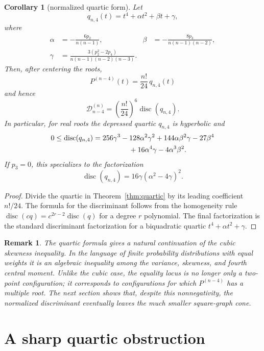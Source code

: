 \documentclass[11pt]{amsart}
\numberwithin{equation}{section}
\newtheorem{corollary}[theorem]{Corollary}
\newtheorem{remark}[theorem]{Remark}
\newcommand{\D}{\mathcal D}
\newcommand{\disc}{\operatorname{disc}}
\begin{document}
\begin{corollary}[normalized quartic form]\label{cor:normalized-quartic}
Let
\[
q_{n,4}(t)=t^4+\alpha t^2+\beta t+\gamma,
\]
where
\[
\begin{aligned}
\alpha&=-\frac{6p_2}{n(n-1)},
&\beta&=-\frac{8p_3}{n(n-1)(n-2)},\\
\gamma&=\frac{3(p_2^2-2p_4)}{n(n-1)(n-2)(n-3)}.
\end{aligned}
\]
Then, after centering the roots,
\[
P^{(n-4)}(t)=\frac{n!}{24}\,q_{n,4}(t)
\]
and hence
\[
\D_{n-4}^{(n)}=\left(\frac{n!}{24}\right)^6\disc(q_{n,4}).
\]
In particular, for real roots the depressed quartic $q_{n,4}$ is hyperbolic
and
\[
\begin{aligned}
0\le \disc(q_{n,4})={}&256\gamma^3-128\alpha^2\gamma^2
+144\alpha\beta^2\gamma-27\beta^4\\
&\hspace{1.3cm}+16\alpha^4\gamma-4\alpha^3\beta^2 .
\end{aligned}
\]
If $p_3=0$, this specializes to the factorization
\[
\disc(q_{n,4})=16\gamma(\alpha^2-4\gamma)^2 .
\]
\end{corollary}

\begin{proof}
Divide the quartic in Theorem~\ref{thm:quartic} by its leading coefficient
$n!/24$.  The formula for the discriminant follows from the homogeneity rule
$\disc(cq)=c^{2r-2}\disc(q)$ for a degree $r$ polynomial.  The final
factorization is the standard discriminant factorization for a biquadratic
quartic $t^4+\alpha t^2+\gamma$.
\end{proof}

\begin{remark}
The quartic formula gives a natural continuation of the cubic skewness
inequality.  In the language of finite probability distributions with equal
weights it is an algebraic inequality among the variance, skewness, and fourth
central moment.  Unlike the cubic case, the equality locus is no longer only a
two-point configuration; it corresponds to configurations for which
$P^{(n-4)}$ has a multiple root.  The next section shows that, despite this
nonnegativity, the normalized discriminant eventually leaves the much smaller
square-graph cone.
\end{remark}

\section{A sharp quartic obstruction}\label{sec:quartic-obstruction}
\end{document}
